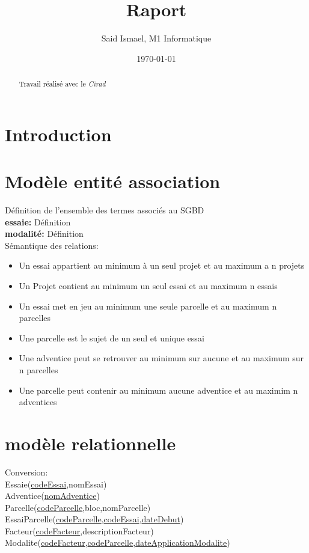 \documentclass{article}
\title{Raport}
\author{Said Ismael, M1 Informatique}
\date{\today}
\begin{document}
\maketitle %


\newpage
\thispagestyle{empty}
\mbox{}
\newpage




\tableofcontents
\newpage


\section{Introduction}
\begin{abstract}
  Travail réalisé avec le \textit{Cirad}~\cite{coursera}
\end{abstract}



\section{Modèle entité association}
Définition de l'ensemble des termes associés au SGBD \\ 
\textbf{essaie:} Définition
\\\textbf{modalité:} Définition \\
Sémantique des relations:
\begin{itemize}
  \item Un essai appartient au minimum à un seul projet et au maximum a n projets 
  \item Un Projet contient au minimum un seul essai et au maximum n essais
  \item Un essai met en jeu au minimum une seule parcelle et au maximum n parcelles
  \item Une parcelle est le sujet de un seul et unique essai
  \item Une adventice peut se retrouver au minimum sur aucune et au maximum sur n parcelles
  \item Une parcelle peut contenir au minimum aucune adventice et au maximim n adventices
  
\end{itemize}


\section{modèle relationnelle}
Conversion:\\
Essaie(\underline{codeEssai},nomEssai)\\
Adventice(\underline{nomAdventice}) \\
Parcelle(\underline{codeParcelle},bloc,nomParcelle)\\
EssaiParcelle(\underline{codeParcelle},\underline{codeEssai},\underline{dateDebut})\\
Facteur(\underline{codeFacteur},descriptionFacteur)\\
Modalite(\underline{codeFacteur},\underline{codeParcelle},\underline{dateApplicationModalite})\\






\end{document}

